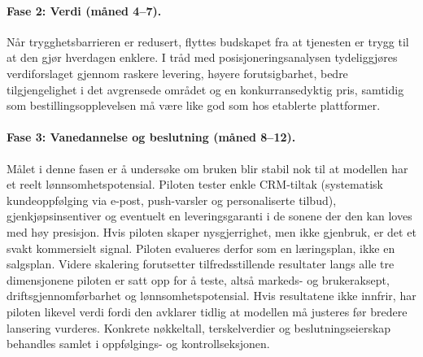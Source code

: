 \paragraph{Fase 2: Verdi (måned 4--7).}
Når trygghetsbarrieren er redusert, flyttes budskapet fra at tjenesten er
trygg til at den gjør hverdagen enklere. I tråd med posisjoneringsanalysen
tydeliggjøres verdiforslaget gjennom raskere levering, høyere
forutsigbarhet, bedre tilgjengelighet i det avgrensede området og en
konkurransedyktig pris, samtidig som bestillingsopplevelsen må være like
god som hos etablerte plattformer.

\paragraph{Fase 3: Vanedannelse og beslutning (måned 8--12).}
Målet i denne fasen er å undersøke om bruken blir stabil nok til at
modellen har et reelt lønnsomhetspotensial. Piloten tester enkle
CRM-tiltak (systematisk kundeoppfølging via e-post, push-varsler og
personaliserte tilbud), gjenkjøpsinsentiver og eventuelt en
leveringsgaranti i de sonene der den kan loves med høy presisjon. Hvis
piloten skaper nysgjerrighet, men ikke gjenbruk, er det et svakt
kommersielt signal. Piloten evalueres derfor som en læringsplan, ikke en
salgsplan. Videre skalering forutsetter tilfredsstillende resultater
langs alle tre dimensjonene piloten er satt opp for å teste, altså
markeds- og brukeraksept, driftsgjennomførbarhet og lønnsomhetspotensial.
Hvis resultatene ikke innfrir, har piloten likevel verdi fordi den
avklarer tidlig at modellen må justeres før bredere lansering vurderes.
Konkrete nøkkeltall, terskelverdier og beslutningseierskap behandles
samlet i oppfølgings- og kontrollseksjonen.
